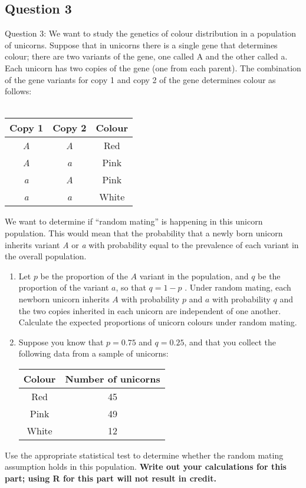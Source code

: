 \documentclass[12pt,a4paper]{article}
\makeatletter
\newenvironment{folding}{\endgroup}{\begingroup \def \@currenvir{folding}\edef \@currenvline{\on@line}}
\makeatother
\begin{document}
	\begin{folding}
		\begin{centering}
			\subsection*{Question 3}
		\end{centering}
	\noindent
	Question 3: We want to study the genetics of colour distribution in a population of unicorns. Suppose that in unicorns there is a single gene that determines colour; there are two variants of the gene, one called A and the other called a. Each unicorn has two copies of the gene (one from each parent). The combination of the gene variants for copy 1 and copy 2 of the gene determines colour as follows: \\\\
	\begin{center}
		\begin{tabular}{c c c}
			Copy 1 & Copy 2 & Colour\\
			\hline
			\emph{A} & \emph{A} & Red \\
			\emph{A} & \emph{a} & Pink \\
			\emph{a} &\emph{A} & Pink\\
			\emph{a} & \emph{a} & White\\
		\end{tabular}
	\end{center}
	We want to determine if “random mating” is happening in this unicorn population. This would mean that the probability that a newly born unicorn inherits variant \emph{A} or \emph{a} with probability equal to the prevalence of each variant in the overall population.
	\begin{enumerate} [label = (\alph*)]
 		\item Let $p$ be the proportion of the $A$ variant in the population, and $q$ be the proportion of the variant $a$, so that $q = 1 - p$ . Under random mating, each newborn unicorn inherits $A$ with probability $p$ and $a$ with probability $q$ and the two copies inherited in each unicorn are independent of one another. Calculate the expected proportions of unicorn colours under random mating.
 		\item Suppose you know that $p = 0.75$ and $q = 0.25$, and that you collect the following data from a sample of unicorns:
 		\begin{center}
 			\begin{tabular}{c c}
 				Colour & Number of unicorns\\
 				\hline
 				Red &45 \\
 				Pink &49 \\
 				White &12\\
 			\end{tabular}
 		\end{center}
	\end{enumerate}
	Use the appropriate statistical test to determine whether the random mating assumption holds in this population. \textbf{Write out your calculations for this part; using R for this part will not result in credit.} 
	\newpage
	\begin{centering}

\end{centering}
\end{folding}
\end{document}
